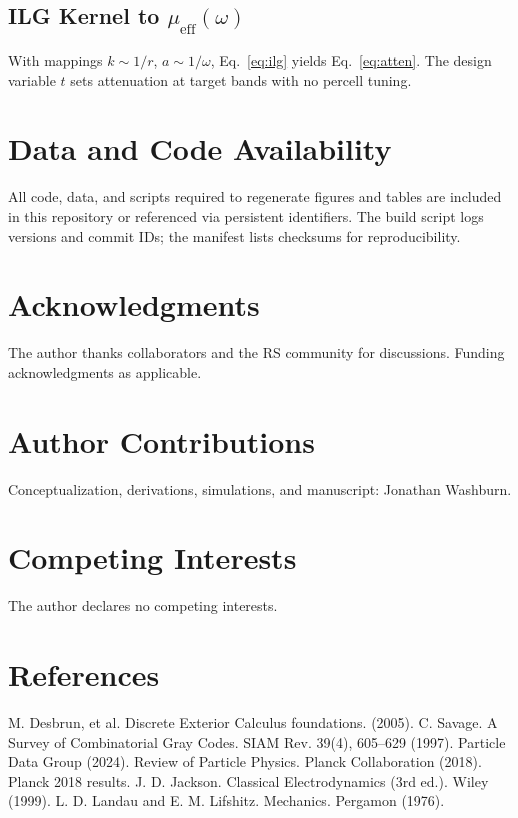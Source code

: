 \documentclass[11pt,a4paper]{article}
\begin{document}
\subsection{ILG Kernel to \texorpdfstring{$\mu_{\mathrm{eff}}(\omega)$}{mu_eff(omega)}}
With mappings \(k\sim 1/r\), \(a\sim 1/\omega\), Eq.~\eqref{eq:ilg} yields Eq.~\eqref{eq:atten}. The design variable \(t\) sets attenuation at target bands with no per\textendash cell tuning.

\section{Data and Code Availability}
\label{sec:data}
All code, data, and scripts required to regenerate figures and tables are included in this repository or referenced via persistent identifiers. The build script logs versions and commit IDs; the manifest lists checksums for reproducibility.

\section*{Acknowledgments}
The author thanks collaborators and the RS community for discussions. Funding acknowledgments as applicable.

\section*{Author Contributions}
Conceptualization, derivations, simulations, and manuscript: Jonathan Washburn.

\section*{Competing Interests}
The author declares no competing interests.

\section*{References}
\begin{thebibliography}{99}
 M. Desbrun, et al. Discrete Exterior Calculus foundations. (2005).
 C. Savage. A Survey of Combinatorial Gray Codes. SIAM Rev. 39(4), 605--629 (1997).
 Particle Data Group (2024). Review of Particle Physics.
 Planck Collaboration (2018). Planck 2018 results.
 J. D. Jackson. Classical Electrodynamics (3rd ed.). Wiley (1999).
 L. D. Landau and E. M. Lifshitz. Mechanics. Pergamon (1976).
\end{thebibliography}
\end{document}
